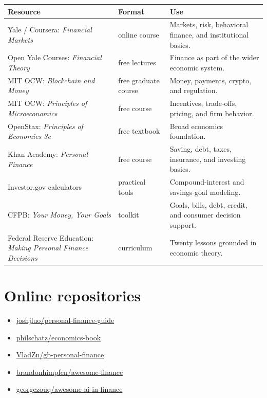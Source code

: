 \documentclass[11pt,openany]{book}
\begin{document}
\begin{longtable}{>{\raggedright\arraybackslash}p{}p{}p{}}
\toprule
\textbf{Resource} & \textbf{Format} & \textbf{Use} \\
\midrule
\endhead
Yale / Coursera: \textit{Financial Markets} & online course & Markets, risk, behavioral finance, and institutional basics. \\
Open Yale Courses: \textit{Financial Theory} & free lectures & Finance as part of the wider economic system. \\
MIT OCW: \textit{Blockchain and Money} & free graduate course & Money, payments, crypto, and regulation. \\
MIT OCW: \textit{Principles of Microeconomics} & free course & Incentives, trade-offs, pricing, and firm behavior. \\
OpenStax: \textit{Principles of Economics 3e} & free textbook & Broad economics foundation. \\
Khan Academy: \textit{Personal Finance} & free course & Saving, debt, taxes, insurance, and investing basics. \\
Investor.gov calculators & practical tools & Compound-interest and savings-goal modeling. \\
CFPB: \textit{Your Money, Your Goals} & toolkit & Goals, bills, debt, credit, and consumer decision support. \\
Federal Reserve Education: \textit{Making Personal Finance Decisions} & curriculum & Twenty lessons grounded in economic theory. \\
\bottomrule
\end{longtable}

\section{Online repositories}

\begin{itemize}
  \item \href{https://github.com/joshjluo/personal-finance-guide}{joshjluo/personal-finance-guide}
  \item \href{https://github.com/philschatz/economics-book}{philschatz/economics-book}
  \item \href{https://github.com/VladZn/gb-personal-finance}{VladZn/gb-personal-finance}
  \item \href{https://github.com/brandonhimpfen/awesome-finance}{brandonhimpfen/awesome-finance}
  \item \href{https://github.com/georgezouq/awesome-ai-in-finance}{georgezouq/awesome-ai-in-finance}
\end{itemize}
\end{document}
